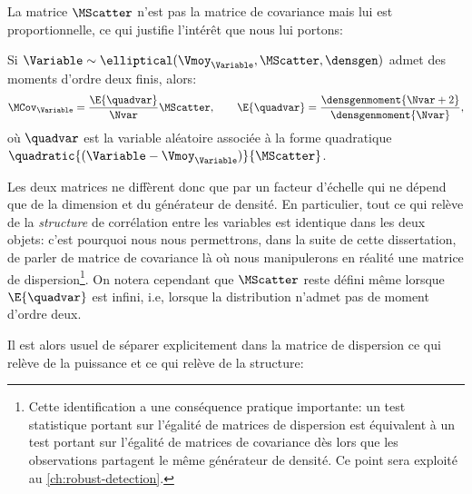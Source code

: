 La matrice $\MScatter$ n'est pas la matrice de covariance mais lui est proportionnelle, ce qui justifie l'intérêt que nous lui portons:


\begin{property}
\label{prop:context-distributions-scattercov}
  Si $\Variable\sim\elliptical(\Vmoy_\Variable,\MScatter,\densgen)$ admet des moments d'ordre deux finis, alors:
  \begin{equation}
    \MCov_\Variable
    =
    \frac{\E\{\quadvar\}}{\Nvar}\MScatter,
    \qquad
    \E\{\quadvar\} = \frac{\densgenmoment{\Nvar+2}}{\densgenmoment{\Nvar}},
    \label{eq:context-distributions-scattercov}
  \end{equation}
  où $\quadvar$ est la variable aléatoire associée à la forme quadratique $\quadratic{(\Variable-\Vmoy_\Variable)}{\MScatter}$.
\end{property}

\begin{remark}
  Les deux matrices ne diffèrent donc que par un facteur d'échelle qui ne dépend que de la dimension et du générateur de densité. En particulier, tout ce qui relève de la \emph{structure} de corrélation entre les variables est identique dans les deux objets: c'est pourquoi nous nous permettrons, dans la suite de cette dissertation, de parler de matrice de covariance là où nous manipulerons en réalité une matrice de dispersion\footnote{Cette identification a une conséquence pratique importante: un test statistique portant sur l'égalité de matrices de dispersion est équivalent à un test portant sur l'égalité de matrices de covariance dès lors que les observations partagent le même générateur de densité. Ce point sera exploité au \cref{ch:robust-detection}.}. On notera cependant que $\MScatter$ reste défini même lorsque $\E\{\quadvar\}$ est infini, i.e, lorsque la distribution n'admet pas de moment d'ordre deux.
\end{remark}

Il est alors usuel de séparer explicitement dans la matrice de dispersion ce qui relève de la puissance et ce qui relève de la structure:

